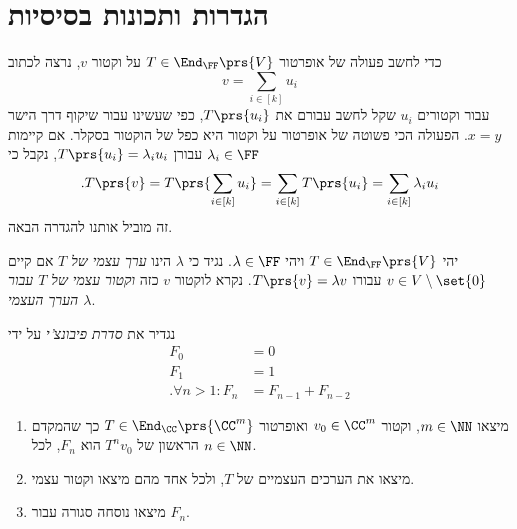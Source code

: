 \documentclass[a4paper,10pt,twoside,openany]{book}
\begin{document}
\section{הגדרות ותכונות בסיסיות}

כדי לחשב פעולה של אופרטור
$T \in \End_\FF\prs{V}$
על וקטור
$v$,
נרצה לכתוב
\[v = \sum_{i \in [k]} u_i\]
עבור וקטורים
$u_i$
שקל לחשב עבורם את
$T\prs{u_i}$,
כפי שעשינו עבור שיקוף דרך הישר
$x=y$.
הפעולה הכי פשוטה של אופרטור על וקטור היא כפל של הוקטור בסקלר.
אם קיימות
$\lambda_i \in \FF$
עבורן
$T\prs{u_i} = \lambda_i u_i$,
נקבל כי
\begin{align*}
\text{.} T\prs{v} = T\prs{\sum_{i \in [k]} u_i} = \sum_{i \in [k]} T\prs{u_i} = \sum_{i \in [k]} \lambda_i u_i 
\end{align*}
זה מוביל אותנו להגדרה הבאה.

\begin{definition}
יהי
$T \in \End_\FF\prs{V}$
ויהי
$\lambda \in \FF$.
נגיד כי
$\lambda$
הינו
\emph{ערך עצמי של
$T$}
אם קיים
$v \in V \setminus \set{0}$
עבורו
$T\prs{v} = \lambda v$.
נקרא לוקטור
$v$
כזה
\emph{וקטור עצמי של
$T$
עבור הערך העצמי
$\lambda$}.
\end{definition}

\begin{exercisechap}
נגדיר את
\emph{סדרת פיבונצ'י}
על ידי
\begin{align*}
F_0 &= 0 \\
F_1 &= 1 \\
\text{.} \forall n > 1: F_n &= F_{n-1} + F_{n-2} 
\end{align*}

\begin{enumerate}
\item מיצאו
$m \in \NN$,
וקטור
$v_0 \in \CC^m$
ואופרטור
$T \in \End_\CC\prs{\CC^m}$
כך שהמקדם הראשון של
$T^n v_0$
הוא
$F_n$,
לכל
$n \in \NN$.

\item מיצאו את הערכים העצמיים של
$T$,
ולכל אחד מהם מיצאו וקטור עצמי.

\item מיצאו נוסחה סגורה עבור
$F_n$.
\end{enumerate}
\end{exercisechap}
\end{document}

